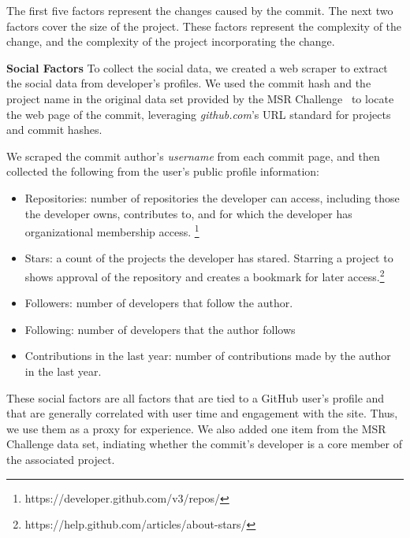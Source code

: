 \documentclass[10pt, conference]{IEEEtran}
\begin{document}
The first five factors represent the changes caused by the commit.  The next two
factors cover the size of the project.  These factors represent the complexity
of the change, and the complexity of the project incorporating the change. 

\vspace{1ex}
\noindent\textbf{Social Factors} To collect the social data, we created a web scraper to extract the social data
from developer's profiles.
We used the commit hash and the project name in the original data
set provided by the MSR Challenge~\cite{msr17challenge} to locate the web page
of the commit, leveraging \textit{github.com}'s URL standard for projects and
commit hashes.

We scraped the commit author's
\textit{username} from each commit page, and then
collected the following from the user's public profile information:
%

\begin{itemize}
\item Repositories: number of repositories the developer can access, including those
the developer owns, contributes
to, and for which the developer has organizational membership access.%
\footnote{https://developer.github.com/v3/repos/}
\item Stars: a count of the projects the developer has stared. Starring a project
to shows approval of the repository and creates  a bookmark for later 
access.\footnote{https://help.github.com/articles/about-stars/}
\item Followers: number of developers that follow the author. 
\item Following: number of developers that the author follows 
\item Contributions in the last year: number of contributions made by the author in the last year.
\end{itemize}


These social factors are all factors that are tied to a GitHub user's profile
and that are generally correlated with user time and engagement with the site.
Thus, we use them as a proxy for
experience.
We also added one item from the MSR Challenge data set, indiating
whether the commit's developer is a core member  
of the associated project.
\end{document}
